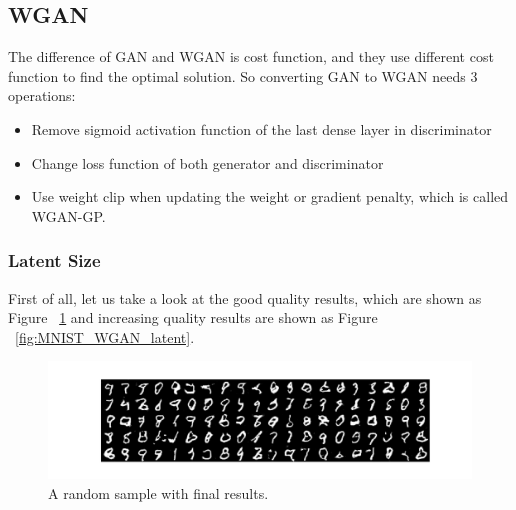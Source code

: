 \documentclass[12pt,letterpaper]{article}
\begin{document}
\subsection{WGAN}

The difference of GAN and WGAN is cost function, and they use different cost function to find the optimal solution. So converting GAN to WGAN needs $3$ operations:
\begin{itemize}
    \item Remove sigmoid activation function of the last dense layer in discriminator
    \item Change loss function of both generator and discriminator
    \item Use weight clip when updating the weight or gradient penalty, which is called WGAN-GP.
\end{itemize}

\subsubsection{Latent Size}

First of all, let us take a look at the good quality results, which are shown as Figure ~\ref{fig:MNIST_WGAN_latent_results} and increasing quality results are shown as Figure ~\ref{fig:MNIST_WGAN_latent}.
\begin{figure}[h]
    \centering
    \includegraphics[width=.6\linewidth]{WGAN_MNIST_0_200_256results.png}
    \caption{\small A random sample with final results.}
    \label{fig:MNIST_WGAN_latent_results}
\end{figure}
\end{document}
